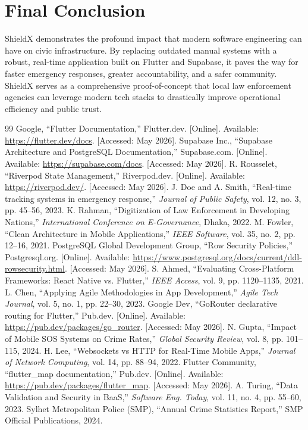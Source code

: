 \documentclass[11pt, a4paper]{report}
\begin{document}
\section{Final Conclusion}
ShieldX demonstrates the profound impact that modern software engineering can have on civic infrastructure. By replacing outdated manual systems with a robust, real-time application built on Flutter and Supabase, it paves the way for faster emergency responses, greater accountability, and a safer community. ShieldX serves as a comprehensive proof-of-concept that local law enforcement agencies can leverage modern tech stacks to drastically improve operational efficiency and public trust.

\begin{thebibliography}{99}
 Google, ``Flutter Documentation,'' Flutter.dev. [Online]. Available: \url{https://flutter.dev/docs}. [Accessed: May 2026].
 Supabase Inc., ``Supabase Architecture and PostgreSQL Documentation,'' Supabase.com. [Online]. Available: \url{https://supabase.com/docs}. [Accessed: May 2026].
 R. Rousselet, ``Riverpod State Management,'' Riverpod.dev. [Online]. Available: \url{https://riverpod.dev/}. [Accessed: May 2026].
 J. Doe and A. Smith, ``Real-time tracking systems in emergency response,'' \textit{Journal of Public Safety}, vol. 12, no. 3, pp. 45--56, 2023.
 K. Rahman, ``Digitization of Law Enforcement in Developing Nations,'' \textit{International Conference on E-Governance}, Dhaka, 2022.
 M. Fowler, ``Clean Architecture in Mobile Applications,'' \textit{IEEE Software}, vol. 35, no. 2, pp. 12--16, 2021.
 PostgreSQL Global Development Group, ``Row Security Policies,'' Postgresql.org. [Online]. Available: \url{https://www.postgresql.org/docs/current/ddl-rowsecurity.html}. [Accessed: May 2026].
 S. Ahmed, ``Evaluating Cross-Platform Frameworks: React Native vs. Flutter,'' \textit{IEEE Access}, vol. 9, pp. 1120--1135, 2021.
 L. Chen, ``Applying Agile Methodologies in App Development,'' \textit{Agile Tech Journal}, vol. 5, no. 1, pp. 22--30, 2023.
 Google Dev, ``GoRouter declarative routing for Flutter,'' Pub.dev. [Online]. Available: \url{https://pub.dev/packages/go_router}. [Accessed: May 2026].
 N. Gupta, ``Impact of Mobile SOS Systems on Crime Rates,'' \textit{Global Security Review}, vol. 8, pp. 101--115, 2024.
 H. Lee, ``Websockets vs HTTP for Real-Time Mobile Apps,'' \textit{Journal of Network Computing}, vol. 14, pp. 88--94, 2022.
 Flutter Community, ``flutter\_map documentation,'' Pub.dev. [Online]. Available: \url{https://pub.dev/packages/flutter_map}. [Accessed: May 2026].
 A. Turing, ``Data Validation and Security in BaaS,'' \textit{Software Eng. Today}, vol. 11, no. 4, pp. 55--60, 2023.
 Sylhet Metropolitan Police (SMP), ``Annual Crime Statistics Report,'' SMP Official Publications, 2024.
\end{thebibliography}
\end{document}
